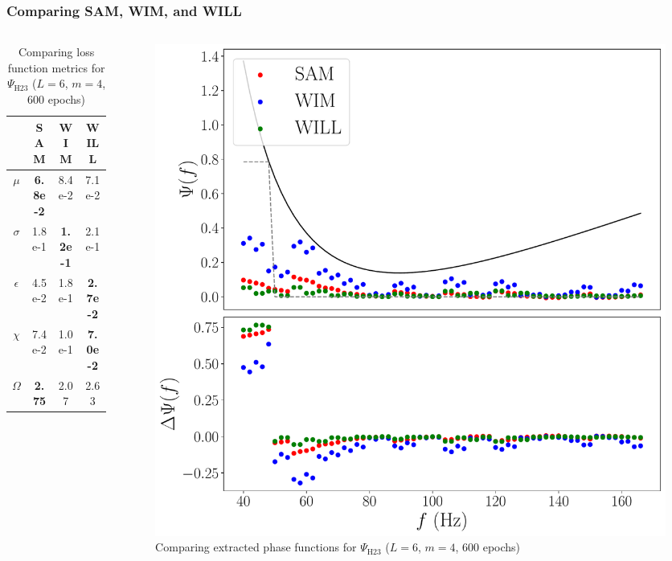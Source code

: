 \documentclass{beamer}
\begin{document}
\begin{frame}
\frametitle{Comparing SAM, WIM, and WILL}
\begin{columns}
\begin{column}{0.5\textwidth}
\begin{table}
\begin{tabular}{c || c| c| c }
& SAM & WIM & WILL \\ \hline \hline 
$\mu$ &  \textbf{6.8e-2} & 8.4e-2 & 7.1e-2 \\
$\sigma$ &  1.8e-1 & \textbf{1.2e-1} & 2.1e-1\\
$\epsilon$  &  4.5e-2 & 1.8e-1 & \textbf{2.7e-2}\\
$\chi$ &  7.4e-2 & 1.0e-1 & \textbf{7.0e-2} \\ \hline 
$\Omega$ &  \textbf{2.75} & 2.07 & 2.63
\end{tabular}
\caption{Comparing loss function metrics for $\Psi_\text{H23}$ ($L=6$, $m=4$, 600 epochs)}
\end{table}
\end{column}
\begin{column}{0.5\textwidth}
\begin{figure}
\centering 
\includegraphics[width=\textwidth]{im/SAM_WIM_WILL_H}
\caption{Comparing extracted phase functions for $\Psi_\text{H23}$ ($L=6$, $m=4$, 600 epochs)}
\end{figure}
\end{column}
\end{columns}
\end{frame}
\end{document}
